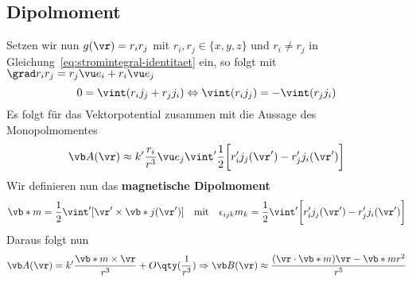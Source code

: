 \subsection{Dipolmoment}%
\label{sub:Dipolmoment}
Setzen wir nun $g(\vr)=r_ir_j$ mit $r_i,r_j\in\{x,y,z\}$ und $r_i\neq r_j$ in Gleichung~\ref{eq:stromintegral-identitaet} ein, so folgt mit
$\grad r_ir_j = r_j \vu e_i + r_i \vu e_j$
\begin{equation}
  0=\vint (r_i j_j + r_j j_i) \Leftrightarrow \vint (r_i j_j) = 
  - \vint (r_j j_i)
\end{equation}
Es folgt für das Vektorpotential zusammen mit die Aussage des Monopolmomentes
\begin{equation}
  \vb A(\vr)\approx k'\frac{r_i}{r^3}\vu e_j \vint' 
  \frac{1}{2} \bigg[r_i' j_j(\vr') - r_j'j_i(\vr')\bigg]
\end{equation}
Wir definieren nun das \textbf{magnetische Dipolmoment} 
\begin{equation}
  \vb*m = \frac{1}{2} \vint' [\vr'\times\vb*j(\vr')]
  \quad\text{mit}\quad
  \epsilon_{ijk}m_k = 
  \frac{1}{2} \vint' \bigg[r_i' j_j(\vr') - r_j'j_i(\vr')\bigg]
\end{equation}
Daraus folgt nun 
\begin{equation}
  \vb A(\vr) = k' \frac{\vb*m\times\vr}{r^3} + O\qty(\frac{1}{r^3})
  \Rightarrow \vb B(\vr) \approx \frac{(\vr\cdot\vb*m)\vr - \vb*mr^2}{r^5} 
\end{equation}
